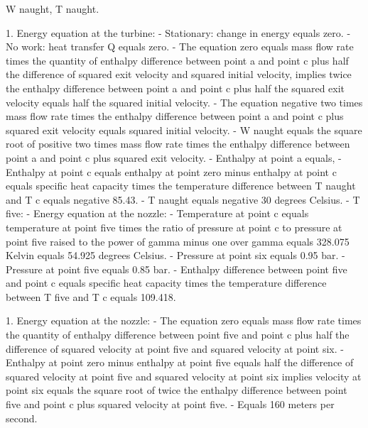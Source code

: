 W naught, T naught.

1. Energy equation at the turbine:
- Stationary: change in energy equals zero.
- No work: heat transfer Q equals zero.
- The equation zero equals mass flow rate times the quantity of enthalpy difference between point a and point c plus half the difference of squared exit velocity and squared initial velocity, implies twice the enthalpy difference between point a and point c plus half the squared exit velocity equals half the squared initial velocity.
- The equation negative two times mass flow rate times the enthalpy difference between point a and point c plus squared exit velocity equals squared initial velocity.
- W naught equals the square root of positive two times mass flow rate times the enthalpy difference between point a and point c plus squared exit velocity.
- Enthalpy at point a equals,
- Enthalpy at point c equals enthalpy at point zero minus enthalpy at point c equals specific heat capacity times the temperature difference between T naught and T c equals negative 85.43.
- T naught equals negative 30 degrees Celsius.
- T five:
- Energy equation at the nozzle:
- Temperature at point c equals temperature at point five times the ratio of pressure at point c to pressure at point five raised to the power of gamma minus one over gamma equals 328.075 Kelvin equals 54.925 degrees Celsius.
- Pressure at point six equals 0.95 bar.
- Pressure at point five equals 0.85 bar.
- Enthalpy difference between point five and point c equals specific heat capacity times the temperature difference between T five and T c equals 109.418.

1. Energy equation at the nozzle:
- The equation zero equals mass flow rate times the quantity of enthalpy difference between point five and point c plus half the difference of squared velocity at point five and squared velocity at point six.
- Enthalpy at point zero minus enthalpy at point five equals half the difference of squared velocity at point five and squared velocity at point six implies velocity at point six equals the square root of twice the enthalpy difference between point five and point c plus squared velocity at point five.
- Equals 160 meters per second.